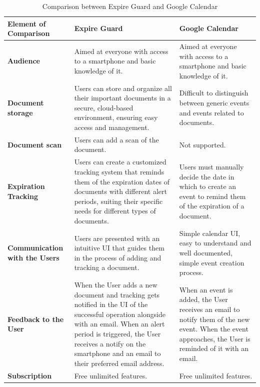 \begin{table}[H]
	
	\begin{tabularx}{\textwidth}{|X|X|X|}
		\hline
		\textbf{Element of Comparison} & \textbf{Expire Guard} & \textbf{Google Calendar} \\ 
		\hline
		\textbf{Audience} & Aimed at everyone with access to a smartphone and basic knowledge of it. & Aimed at everyone with access to a smartphone and basic knowledge of it. \\
		\hline
		\textbf{Document storage} & Users can store and organize all their important documents in a secure, cloud-based environment, ensuring easy access and management. & Difficult to distinguish between generic events and events related to documents. \\
		\hline
		\textbf{Document scan} & Users can add a scan of the document. & Not supported. \\
		\hline
		\textbf{Expiration Tracking} & Users can create a customized tracking system that reminds them of the expiration dates of documents with different alert periods, suiting their specific needs for different types of documents. & Users must manually decide the date in which to create an event to remind them of the expiration of a document. \\
		\hline
		\textbf{Communication with the Users} & Users are presented with an intuitive UI that guides them in the process of adding and tracking a document. & Simple calendar UI, easy to understand and well documented, simple event creation process. \\
		\hline
		\textbf{Feedback to the User} & When the User adds a new document and tracking gets notified in the UI of the successful operation alongside with an email. When an alert period is triggered, the User receives a notify on the smartphone and an email to their preferred email address. & When an event is added, the User receives an email to notify them of the new event. When the event approaches, the User is reminded of it with an email. \\
		\hline
		\textbf{Subscription} & Free unlimited features. & Free unlimited features. \\
		\hline
	\end{tabularx}
	\caption{Comparison between Expire Guard and Google Calendar}
\end{table}
